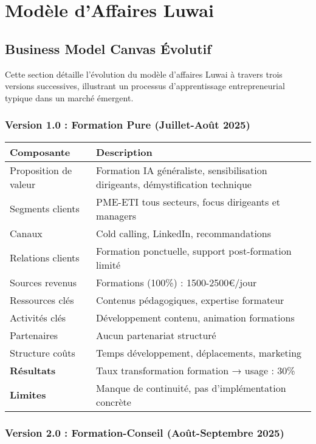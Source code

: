 \chapter{Modèle d'Affaires Luwai}
\label{app:luwai}

\section{Business Model Canvas Évolutif}

Cette section détaille l'évolution du modèle d'affaires Luwai à travers trois versions successives, illustrant un processus d'apprentissage entrepreneurial typique dans un marché émergent.

\subsection{Version 1.0 : Formation Pure (Juillet-Août 2025)}

\begin{longtable}{@{}>{\raggedright\arraybackslash}p{4cm}>{\raggedright\arraybackslash}p{10cm}@{}}
\toprule
\textbf{Composante} & \textbf{Description} \\
\midrule
Proposition de valeur & Formation IA généraliste, sensibilisation dirigeants, démystification technique \\
Segments clients & PME-ETI tous secteurs, focus dirigeants et managers \\
Canaux & Cold calling, LinkedIn, recommandations \\
Relations clients & Formation ponctuelle, support post-formation limité \\
Sources revenus & Formations (100\%) : 1500-2500€/jour \\
Ressources clés & Contenus pédagogiques, expertise formateur \\
Activités clés & Développement contenu, animation formations \\
Partenaires & Aucun partenariat structuré \\
Structure coûts & Temps développement, déplacements, marketing \\
\midrule
\textbf{Résultats} & Taux transformation formation → usage : 30\% \\
\textbf{Limites} & Manque de continuité, pas d'implémentation concrète \\
\bottomrule
\end{longtable}

\subsection{Version 2.0 : Formation-Conseil (Août-Septembre 2025)}


